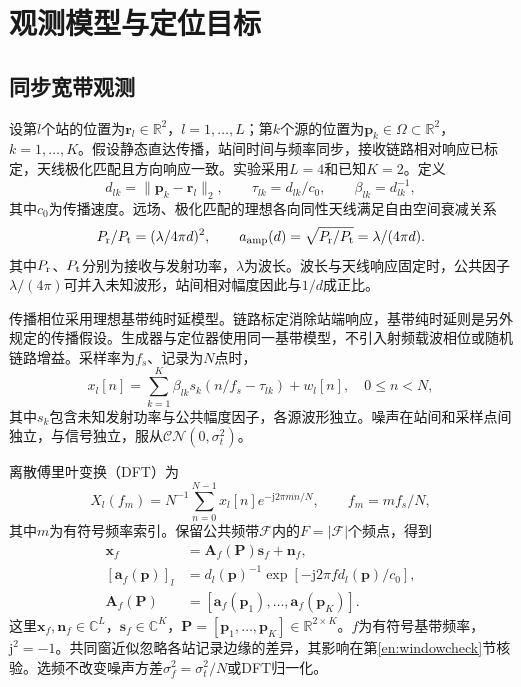 \documentclass[a4paper,fleqn]{cas-sc}
\newcommand{\R}{\mathbb R}
\newcommand{\C}{\mathbb C}
\begin{document}
\FloatBarrier
\section{观测模型与定位目标}
\FloatBarrier
\subsection{同步宽带观测}
设第$l$个站的位置为$\bm r_l\in\R^2$，$l=1,\ldots,L$；第$k$个源的位置为$\bm p_k\in\Omega\subset\R^2$，$k=1,\ldots,K$。假设静态直达传播，站间时间与频率同步，接收链路相对响应已标定，天线极化匹配且方向响应一致。实验采用$L=4$和已知$K=2$。定义
\begin{equation}
d_{lk}=\|\bm p_k-\bm r_l\|_2,\qquad
\tau_{lk}=d_{lk}/c_0,\qquad \beta_{lk}=d_{lk}^{-1},
\label{en:distance}
\end{equation}
其中$c_0$为传播速度。远场、极化匹配的理想各向同性天线满足自由空间衰减关系
\begin{equation}
P_{\rm r}/P_{\rm t}=(\lambda/4\pi d)^2,\qquad
a_{\rm amp}(d)=\sqrt{P_{\rm r}/P_{\rm t}}=\lambda/(4\pi d).
\label{en:freespace}
\end{equation}
其中$P_{\rm r}$、$P_{\rm t}$分别为接收与发射功率，$\lambda$为波长\cite{ITURP5252024}。波长与天线响应固定时，公共因子$\lambda/(4\pi)$可并入未知波形，站间相对幅度因此与$1/d$成正比。

传播相位采用理想基带纯时延模型。链路标定消除站端响应，基带纯时延则是另外规定的传播假设。生成器与定位器使用同一基带模型，不引入射频载波相位或随机链路增益。采样率为$f_s$、记录为$N$点时，
\begin{equation}
x_l[n]=\sum_{k=1}^K\beta_{lk}s_k(n/f_s-\tau_{lk})+w_l[n],
\quad 0\le n<N,
\end{equation}
其中$s_k$包含未知发射功率与公共幅度因子，各源波形独立。噪声在站间和采样点间独立，与信号独立，服从$\mathcal{CN}(0,\sigma_t^2)$。

离散傅里叶变换（DFT）为
\begin{equation}
X_l(f_m)=N^{-1}\sum_{n=0}^{N-1}x_l[n]e^{-\mathrm j2\pi mn/N},
\qquad f_m=mf_s/N,
\label{en:dft}
\end{equation}
其中$m$为有符号频率索引。保留公共频带$\mathcal F$内的$F=|\mathcal F|$个频点，得到
\begin{align}
\bm x_f&=\bm A_f(\bm P)\bm s_f+\bm n_f,\label{en:frequency}\\
[\bm a_f(\bm p)]_l&=d_l(\bm p)^{-1}
 \exp[-\mathrm j2\pi f d_l(\bm p)/c_0],\label{en:response}\\
\bm A_f(\bm P)&=[\bm a_f(\bm p_1),\ldots,\bm a_f(\bm p_K)].\nonumber
\end{align}
这里$\bm x_f,\bm n_f\in\C^L$，$\bm s_f\in\C^K$，$\bm P=[\bm p_1,\ldots,\bm p_K]\in\R^{2\times K}$。$f$为有符号基带频率，$\mathrm j^2=-1$。共同窗近似忽略各站记录边缘的差异\cite{ChenHudsonYao2002}，其影响在第\ref{en:windowcheck}节核验。选频不改变噪声方差$\sigma_f^2=\sigma_t^2/N$或DFT归一化。
\end{document}
